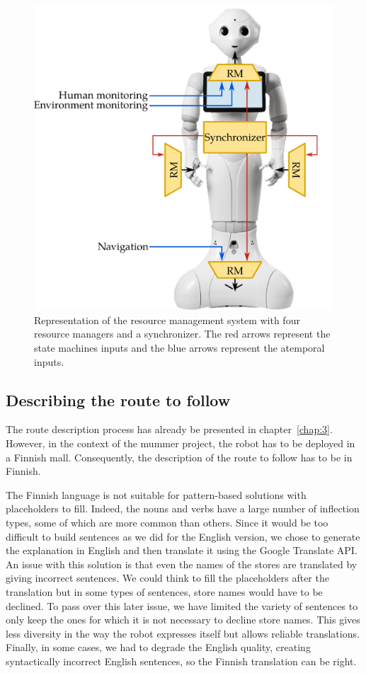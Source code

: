 \begin{figure}[!hb]
\centering
\includegraphics[scale=0.28]{figures/chapter8/rm.png}
\caption{\label{fig:chap8_rm} Representation of the resource management system with four resource managers and a synchronizer. The red arrows represent the state machines inputs and the blue arrows represent the atemporal inputs.}
\end{figure}

\subsection{Describing the route to follow}

The route description process has already be presented in chapter~\ref{chap:3}. However, in the context of the \acrshort{mummer} project, the robot has to be deployed in a Finnish mall. Consequently, the description of the route to follow has to be in Finnish.

The Finnish language is not suitable for pattern-based solutions with placeholders to fill. Indeed, the nouns and verbs have a large number of inflection types, some of which are more common than others. Since it would be too difficult to build sentences as we did for the English version, we chose to generate the explanation in English and then translate it using the Google Translate API. An issue with this solution is that even the names of the stores are translated by giving incorrect sentences. We could think to fill the placeholders after the translation but in some types of sentences, store names would have to be declined. To pass over this later issue, we have limited the variety of sentences to only keep the ones for which it is not necessary to decline store names. This gives less diversity in the way the robot expresses itself but allows reliable translations. Finally, in some cases, we had to degrade the English quality, creating syntactically incorrect English sentences, so the Finnish translation can be right.

